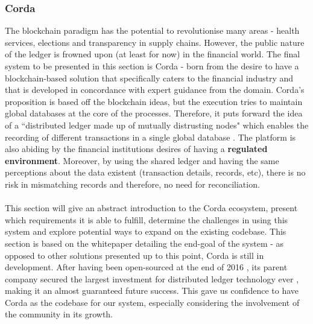 \documentclass[12pt,twoside]{article}
\begin{document}
\subsubsection{Corda}
\label{sub:Corda}
The blockchain paradigm has the potential to revolutionise many areas - health services, elections and transparency in supply chains. However, the public nature of the ledger is frowned upon (at least for now) in the financial world. The final system to be presented in this section is Corda - born from the desire to have a blockchain-based solution that specifically caters to the financial industry and that is developed in concordance with expert guidance from the domain. Corda's proposition is based off the blockchain ideas, but the execution tries to maintain global databases at the core of the processes. Therefore, it puts forward the idea of a ``distributed ledger made up of mutually distrusting nodes" which enables the recording of different transactions in a single global database \cite{Corda:IP}. The platform is also abiding by the financial institutions desires of having a \textbf{regulated environment}. Moreover, by using the shared ledger and having the same perceptions about the data existent (transaction details, records, etc), there is no risk in mismatching records and therefore, no need for reconciliation.
\\ \\
This section will give an abstract introduction to the Corda ecosystem, present which requirements it is able to fulfill, determine the challenges in using this system and explore potential ways to expand on the existing codebase. This section is based on the whitepaper detailing the end-goal of the system - as opposed to other solutions presented up to this point, Corda is still in development. After having been open-sourced at the end of 2016 \cite{cordaops}, its parent company secured the largest investment for distributed ledger technology ever \cite{cordainv}, making it an almost guaranteed future success. This gave us confidence to have Corda as the codebase for our system, especially considering the involvement of the community in its growth.
\\ \\
\end{document}

